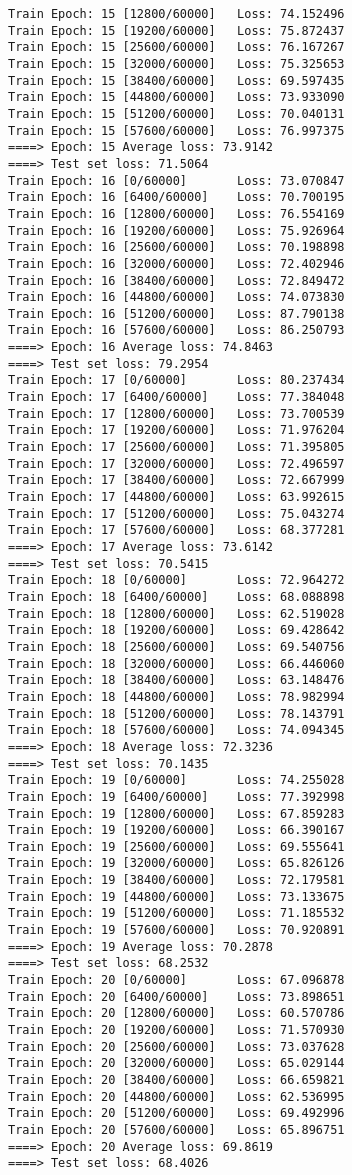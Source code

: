 \documentclass[11pt]{article}
\begin{document}
\begin{Verbatim}[commandchars=\\\{\}]
Train Epoch: 15 [12800/60000]   Loss: 74.152496
Train Epoch: 15 [19200/60000]   Loss: 75.872437
Train Epoch: 15 [25600/60000]   Loss: 76.167267
Train Epoch: 15 [32000/60000]   Loss: 75.325653
Train Epoch: 15 [38400/60000]   Loss: 69.597435
Train Epoch: 15 [44800/60000]   Loss: 73.933090
Train Epoch: 15 [51200/60000]   Loss: 70.040131
Train Epoch: 15 [57600/60000]   Loss: 76.997375
====> Epoch: 15 Average loss: 73.9142
====> Test set loss: 71.5064
Train Epoch: 16 [0/60000]       Loss: 73.070847
Train Epoch: 16 [6400/60000]    Loss: 70.700195
Train Epoch: 16 [12800/60000]   Loss: 76.554169
Train Epoch: 16 [19200/60000]   Loss: 75.926964
Train Epoch: 16 [25600/60000]   Loss: 70.198898
Train Epoch: 16 [32000/60000]   Loss: 72.402946
Train Epoch: 16 [38400/60000]   Loss: 72.849472
Train Epoch: 16 [44800/60000]   Loss: 74.073830
Train Epoch: 16 [51200/60000]   Loss: 87.790138
Train Epoch: 16 [57600/60000]   Loss: 86.250793
====> Epoch: 16 Average loss: 74.8463
====> Test set loss: 79.2954
Train Epoch: 17 [0/60000]       Loss: 80.237434
Train Epoch: 17 [6400/60000]    Loss: 77.384048
Train Epoch: 17 [12800/60000]   Loss: 73.700539
Train Epoch: 17 [19200/60000]   Loss: 71.976204
Train Epoch: 17 [25600/60000]   Loss: 71.395805
Train Epoch: 17 [32000/60000]   Loss: 72.496597
Train Epoch: 17 [38400/60000]   Loss: 72.667999
Train Epoch: 17 [44800/60000]   Loss: 63.992615
Train Epoch: 17 [51200/60000]   Loss: 75.043274
Train Epoch: 17 [57600/60000]   Loss: 68.377281
====> Epoch: 17 Average loss: 73.6142
====> Test set loss: 70.5415
Train Epoch: 18 [0/60000]       Loss: 72.964272
Train Epoch: 18 [6400/60000]    Loss: 68.088898
Train Epoch: 18 [12800/60000]   Loss: 62.519028
Train Epoch: 18 [19200/60000]   Loss: 69.428642
Train Epoch: 18 [25600/60000]   Loss: 69.540756
Train Epoch: 18 [32000/60000]   Loss: 66.446060
Train Epoch: 18 [38400/60000]   Loss: 63.148476
Train Epoch: 18 [44800/60000]   Loss: 78.982994
Train Epoch: 18 [51200/60000]   Loss: 78.143791
Train Epoch: 18 [57600/60000]   Loss: 74.094345
====> Epoch: 18 Average loss: 72.3236
====> Test set loss: 70.1435
Train Epoch: 19 [0/60000]       Loss: 74.255028
Train Epoch: 19 [6400/60000]    Loss: 77.392998
Train Epoch: 19 [12800/60000]   Loss: 67.859283
Train Epoch: 19 [19200/60000]   Loss: 66.390167
Train Epoch: 19 [25600/60000]   Loss: 69.555641
Train Epoch: 19 [32000/60000]   Loss: 65.826126
Train Epoch: 19 [38400/60000]   Loss: 72.179581
Train Epoch: 19 [44800/60000]   Loss: 73.133675
Train Epoch: 19 [51200/60000]   Loss: 71.185532
Train Epoch: 19 [57600/60000]   Loss: 70.920891
====> Epoch: 19 Average loss: 70.2878
====> Test set loss: 68.2532
Train Epoch: 20 [0/60000]       Loss: 67.096878
Train Epoch: 20 [6400/60000]    Loss: 73.898651
Train Epoch: 20 [12800/60000]   Loss: 60.570786
Train Epoch: 20 [19200/60000]   Loss: 71.570930
Train Epoch: 20 [25600/60000]   Loss: 73.037628
Train Epoch: 20 [32000/60000]   Loss: 65.029144
Train Epoch: 20 [38400/60000]   Loss: 66.659821
Train Epoch: 20 [44800/60000]   Loss: 62.536995
Train Epoch: 20 [51200/60000]   Loss: 69.492996
Train Epoch: 20 [57600/60000]   Loss: 65.896751
====> Epoch: 20 Average loss: 69.8619
====> Test set loss: 68.4026
    \end{Verbatim}
\end{document}
